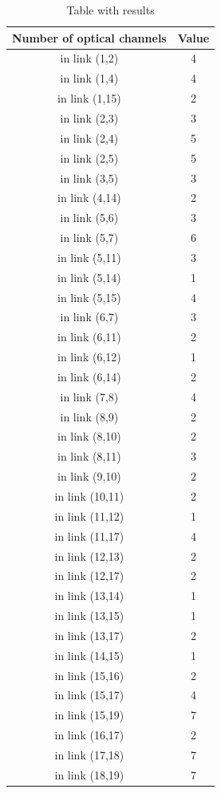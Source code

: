 \begin{table}[h!]
\centering
\begin{tabular}{|| c | c||}
 \hline
 Number of optical channels & Value \\
 \hline\hline
in link (1,2) & 4 \\
in link (1,4) & 4 \\
in link (1,15) & 2 \\
in link (2,3) & 3 \\
in link (2,4) & 5 \\
in link (2,5) & 5 \\
in link (3,5) & 3 \\
in link (4,14) & 2 \\
in link (5,6) & 3 \\
in link (5,7) & 6 \\
in link (5,11) & 3 \\
in link (5,14) & 1 \\
in link (5,15) & 4 \\
in link (6,7) & 3 \\
in link (6,11) & 2 \\
in link (6,12) & 1 \\
in link (6,14) & 2 \\
in link (7,8) & 4 \\
in link (8,9) & 2 \\
in link (8,10) & 2 \\
in link (8,11) & 3 \\
in link (9,10) & 2 \\
in link (10,11) & 2 \\
in link (11,12) & 1 \\
in link (11,17) & 4 \\
in link (12,13) & 2 \\
in link (12,17) & 2 \\
in link (13,14) & 1 \\
in link (13,15) & 1 \\
in link (13,17) & 2 \\
in link (14,15) & 1 \\
in link (15,16) & 2 \\
in link (15,17) & 4 \\
in link (15,19) & 7 \\
in link (16,17) & 2 \\
in link (17,18) & 7 \\
in link (18,19) & 7 \\
\hline
\end{tabular}
\caption{Table with results}
\label{result_ILP3}
\end{table}

